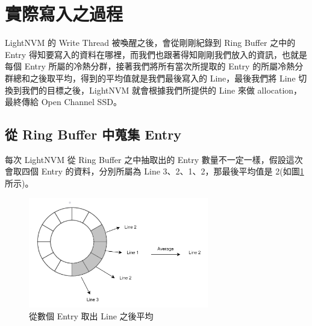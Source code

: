 \section{實際寫入之過程}\label{s3.3}
\indent
LightNVM 的 Write Thread 被喚醒之後，會從剛剛紀錄到 Ring Buffer 之中的 Entry 得知要寫入的資料在哪裡，而我們也跟著得知剛剛我們放入的資訊，也就是每個 Entry 所屬的冷熱分群，接著我們將所有當次所提取的 Entry 的所屬冷熱分群總和之後取平均，得到的平均值就是我們最後寫入的 Line，最後我們將 Line 切換到我們的目標之後，LightNVM 就會根據我們所提供的 Line 來做 allocation，最終傳給 Open Channel SSD。

\subsection{從 Ring Buffer 中蒐集 Entry}\label{s3.3.1}
\indent
每次 LightNVM 從 Ring Buffer 之中抽取出的 Entry 數量不一定一樣，假設這次會取四個 Entry 的資料，分別所屬為 Line 3、2、1、2，那最後平均值是 2(如圖\ref{f3.9}所示)。

\begin{figure}[H]
    \centering
    \includegraphics[width=0.7\textwidth]{picture/ch3/get_entry_from_ring_buffer.png}
    \caption{從數個 Entry 取出 Line 之後平均}
    \label{f3.9}
\end{figure}

\newpage
